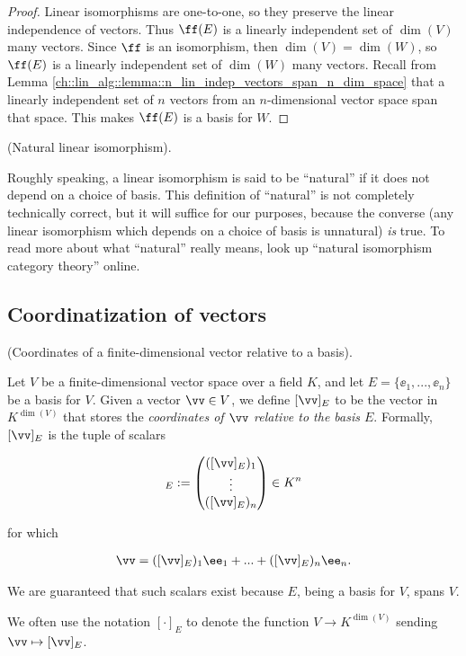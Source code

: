 \begin{proof}
    Linear isomorphisms are one-to-one, so they preserve the linear independence of vectors. Thus $\ff(E)$ is a linearly independent set of $\dim(V)$ many vectors. Since $\ff$ is an isomorphism, then $\dim(V) = \dim(W)$, so $\ff(E)$ is a linearly independent set of $\dim(W)$ many vectors. Recall from Lemma \ref{ch::lin_alg::lemma::n_lin_indep_vectors_span_n_dim_space} that a linearly independent set of $n$ vectors from an $n$-dimensional vector space span that space. This makes $\ff(E)$ is a basis for $W$.
\end{proof}

\begin{defn}
\label{ch::lin_alg::defn::natural_iso}
    (Natural linear isomorphism).
    
    Roughly speaking, a linear isomorphism is said to be ``natural'' if it does not depend on a choice of basis. This definition of ``natural'' is not completely technically correct, but it will suffice for our purposes, because the converse (any linear isomorphism which depends on a choice of basis is unnatural) \textit{is} true. To read more about what ``natural'' really means, look up ``natural isomorphism category theory'' online.
\end{defn}

\newpage

\subsection*{Coordinatization of vectors}

\begin{defn}
\label{ch::lin_alg::defn::coordinates_relative_to_basis}
    (Coordinates of a finite-dimensional vector relative to a basis).
    
    Let $V$ be a finite-dimensional vector space over a field $K$, and let $E = \{\ee_1, ..., \ee_n\}$ be a basis for $V$. Given a vector $\vv \in V$, we define $[\vv]_E$ to be the vector in $K^{\dim(V)}$ that stores the \textit{coordinates of $\vv$ relative to the basis $E$}. Formally, $[\vv]_E$ is the tuple of scalars 
    
    \begin{align*}
        [\vv]_E := \begin{pmatrix} ([\vv]_E)_1 \\ \vdots \\ ([\vv]_E)_n \end{pmatrix} \in K^n
    \end{align*}
    
    for which
    
    \begin{align*}
        \vv = ([\vv]_E)_1 \ee_1 + ... + ([\vv]_E)_n \ee_n.
    \end{align*}
    
    We are guaranteed that such scalars exist because $E$, being a basis for $V$, spans $V$.

    We often use the notation $[\cdot]_E$ to denote the function $V \rightarrow K^{\dim(V)}$ sending $\vv \mapsto [\vv]_E$.
\end{defn}

